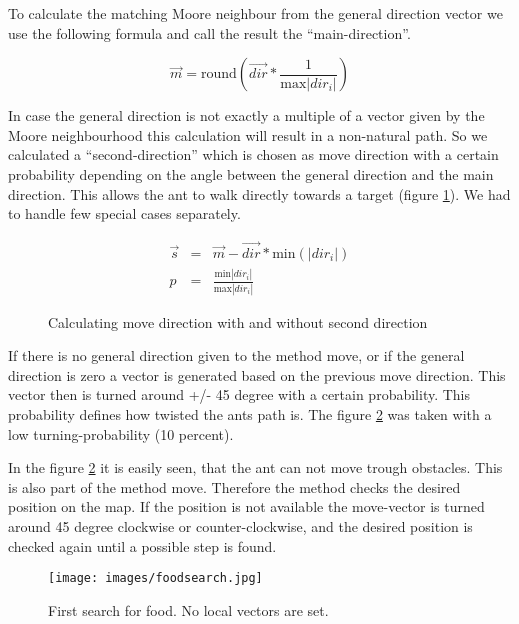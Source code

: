 \documentclass[11pt]{article}
\begin{document}
To calculate the matching Moore neighbour from the general direction vector we use the following formula and call the result the “main-direction”.

\begin{equation}
\vec{m} = \text{round}\left(\vec{dir}*\frac{1}{\text{max}|dir_i|}\right)
\end{equation}

In case the general direction is not exactly a multiple of a vector given by the Moore neighbourhood this calculation will result in a non-natural path. So we calculated a “second-direction” which is chosen as move direction with a certain probability depending on the angle between the general direction and the main direction. This allows the ant to walk directly towards a target (figure \ref{secdir}). We had to handle few special cases separately.

\begin{eqnarray}
\vec{s} & = & \vec{m}-\vec{dir} * \text{min} \left( |dir_i| \right) \\
p & = & \frac{\text{min}|dir_i|}{\text{max} |dir_i|}
\end{eqnarray}

\begin{figure}[h!]
   \centering
    \hspace*{1cm}
   \caption[Comparison: Using second direction or not]{Calculating move direction with and without second direction}
\label{secdir}
\end{figure}

If there is no general direction given to the method move, or if the general direction is zero a vector is generated based on the previous move direction. This vector then is turned around +/- 45 degree with a certain probability. This probability defines how twisted the ants path is. The figure \ref{firstrun} was taken with a low turning-probability (10 percent).

In the figure \ref{firstrun} it is easily seen, that the ant can not move trough obstacles. This is also part of the method move. Therefore the method checks the desired position on the map. If the position is not available the move-vector is turned around 45 degree clockwise or counter-clockwise, and the desired position is checked again until a possible step is found.

\begin{figure}[h!]
   \centering
   \texttt{[image: images/foodsearch.jpg]}
   \caption[Ants first search for food]{First search for food. No local vectors are set.}
\label{firstrun}
\end{figure}
\end{document}
